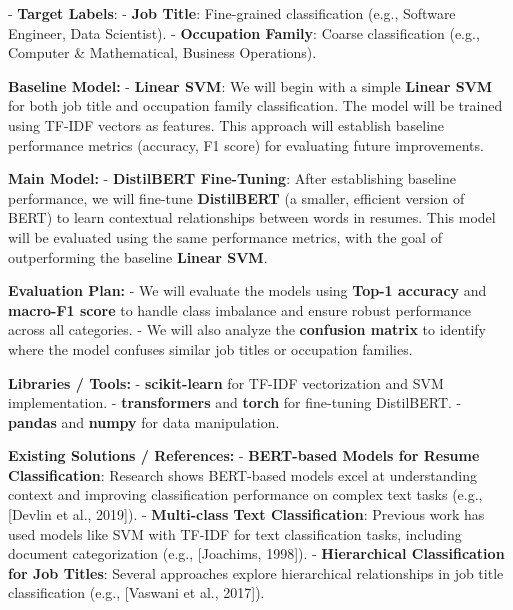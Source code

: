 \documentclass[12pt]{article}
\begin{document}
- \textbf{Target Labels}:  
    - \textbf{Job Title}: Fine-grained classification (e.g., Software Engineer, Data Scientist).
    - \textbf{Occupation Family}: Coarse classification (e.g., Computer \& Mathematical, Business Operations).

\medskip
\noindent \textbf{Baseline Model:}  
- \textbf{Linear SVM}: We will begin with a simple \textbf{Linear SVM} for both job title and occupation family classification. The model will be trained using TF-IDF vectors as features. This approach will establish baseline performance metrics (accuracy, F1 score) for evaluating future improvements.

\medskip
\noindent \textbf{Main Model:}  
- \textbf{DistilBERT Fine-Tuning}: After establishing baseline performance, we will fine-tune \textbf{DistilBERT} (a smaller, efficient version of BERT) to learn contextual relationships between words in resumes. This model will be evaluated using the same performance metrics, with the goal of outperforming the baseline \textbf{Linear SVM}.

\medskip
\noindent \textbf{Evaluation Plan:}  
- We will evaluate the models using \textbf{Top-1 accuracy} and \textbf{macro-F1 score} to handle class imbalance and ensure robust performance across all categories.
- We will also analyze the \textbf{confusion matrix} to identify where the model confuses similar job titles or occupation families.
  
\medskip
\noindent \textbf{Libraries / Tools:}  
- \textbf{scikit-learn} for TF-IDF vectorization and SVM implementation.
- \textbf{transformers} and \textbf{torch} for fine-tuning DistilBERT.
- \textbf{pandas} and \textbf{numpy} for data manipulation.

\medskip
\noindent \textbf{Existing Solutions / References:}  
- \textbf{BERT-based Models for Resume Classification}: Research shows BERT-based models excel at understanding context and improving classification performance on complex text tasks (e.g., [Devlin et al., 2019]).
- \textbf{Multi-class Text Classification}: Previous work has used models like SVM with TF-IDF for text classification tasks, including document categorization (e.g., [Joachims, 1998]).
- \textbf{Hierarchical Classification for Job Titles}: Several approaches explore hierarchical relationships in job title classification (e.g., [Vaswani et al., 2017]).
\end{document}
